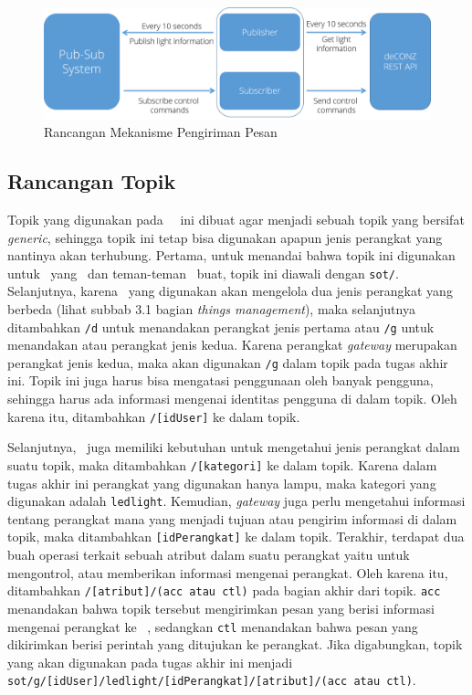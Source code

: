 \begin{figure}
	\centering
	\includegraphics[width=.9\textwidth]{pics/rancangan-pengiriman-pesan.png}
	\caption{Rancangan Mekanisme Pengiriman Pesan}
	\label{fig:rancanan-pengiriman-pesan}
\end{figure}

\subsection{Rancangan Topik}
Topik yang digunakan pada \plat~\iot~ini dibuat agar menjadi sebuah topik yang bersifat \textit{generic}, sehingga topik ini tetap bisa digunakan apapun jenis perangkat yang nantinya akan terhubung. Pertama, untuk menandai bahwa topik ini digunakan untuk \plat~yang \saya~dan teman-teman \saya~buat, topik ini diawali dengan \texttt{sot/}. Selanjutnya, karena \plat~yang digunakan akan mengelola dua jenis perangkat yang berbeda (lihat subbab 3.1 bagian \textit{things management}), maka selanjutnya ditambahkan \texttt{/d} untuk menandakan perangkat jenis pertama atau \texttt{/g} untuk menandakan atau perangkat jenis kedua. Karena perangkat \textit{gateway} merupakan perangkat jenis kedua, maka akan digunakan \texttt{/g} dalam topik pada tugas akhir ini. Topik ini juga harus bisa mengatasi penggunaan oleh banyak pengguna, sehingga harus ada informasi mengenai identitas pengguna di dalam topik. Oleh karena itu, ditambahkan \texttt{/[idUser]} ke dalam topik.

Selanjutnya, \plat~juga memiliki kebutuhan untuk mengetahui jenis perangkat dalam suatu topik, maka ditambahkan \texttt{/[kategori]} ke dalam topik. Karena dalam tugas akhir ini perangkat yang digunakan hanya lampu, maka kategori yang digunakan adalah \texttt{ledlight}. Kemudian, \textit{gateway} juga perlu mengetahui informasi tentang perangkat mana yang menjadi tujuan atau pengirim informasi di dalam topik, maka ditambahkan \texttt{[idPerangkat]} ke dalam topik. Terakhir, terdapat dua buah operasi terkait sebuah atribut dalam suatu perangkat yaitu untuk mengontrol, atau memberikan informasi mengenai perangkat. Oleh karena itu, ditambahkan \texttt{/[atribut]/(acc atau ctl)} pada bagian akhir dari topik. \texttt{acc} menandakan bahwa topik tersebut mengirimkan pesan yang berisi informasi mengenai perangkat ke \plat~, sedangkan \texttt{ctl} menandakan bahwa pesan yang dikirimkan berisi perintah yang ditujukan ke perangkat. Jika digabungkan, topik yang akan digunakan pada tugas akhir ini menjadi \texttt{sot/g/[idUser]/ledlight/[idPerangkat]/[atribut]/(acc atau ctl)}.

